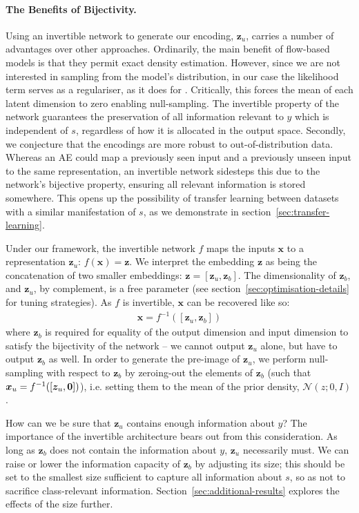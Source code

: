 \paragraph{The Benefits of Bijectivity.}
Using an invertible network to generate our encoding, $\bm{z}_u$, carries a number of advantages over other approaches.
Ordinarily, the main benefit of flow-based models is that they permit exact density estimation. 
However, since we are not interested in sampling from the model's distribution, in our case the likelihood term serves as a regulariser, as it does for  \citet{JacSmeOya18}. 
Critically, this forces the mean of each latent dimension to zero enabling null-sampling. 
The invertible property of the network guarantees the preservation of all information relevant to $y$ which is independent of $s$, regardless of how it is allocated in the output space.
Secondly, we conjecture that the encodings are more robust to out-of-distribution data.
Whereas an \acf{AE} could map a previously seen input and a previously unseen input to the same representation,
an invertible network sidesteps this due to the network's bijective property, ensuring all relevant information is stored somewhere. This opens up the possibility of transfer learning between datasets with a similar manifestation of $s$, as we demonstrate in section~\ref{sec:transfer-learning}.

Under our framework, the invertible network $f$ maps the inputs $\bm{x}$ to a representation $\bm{z}_u$:
$f(\bm{x}) = \bm{z}$.
We interpret the embedding $\bm{z}$ as being the concatenation of two smaller embeddings: $\bm{z} = [\bm{z}_u, \bm{z}_b]$.
The dimensionality of $\bm{z}_b$, and $\bm{z}_u$, by complement, is a free parameter (see section~\ref{sec:optimisation-details} for tuning strategies).
As $f$ is invertible, $\bm{x}$ can be recovered like so:
\begin{align}
  \bm{x} = f^{-1}([\bm{z}_u, \bm{z}_b])
  \label{eq:zreconstruct}
\end{align}
where $\bm{z}_b$ is required for equality of the output dimension and input dimension to satisfy the bijectivity of the network -- we cannot output $\bm{z}_u$ alone, but have to output $\bm{z}_b$ as well. In order to generate the pre-image of $\bm{z}_u$, we perform null-sampling with respect to $\bm{z}_b$ by zeroing-out the elements of $\bm{z}_b$ (such that $\bm{x}_{u} = f^{-1}([\bm{z}_{u}, {\bm{0}}])$), i.e. setting them to the mean of the prior density, $\mathcal{N}(z;0, I)$.

How can we be sure that $\bm{z}_u$ contains enough information about $y$?
The importance of the invertible architecture bears out from this consideration. %
As long as $\bm{z}_b$ does not contain the information about $y$, $\bm{z}_u$ necessarily must.
We can raise or lower the information capacity of $\bm{z}_b$ by adjusting its size;
this should be set to the smallest size sufficient to capture all information about $s$, so as not to sacrifice class-relevant information.
Section~\ref{sec:additional-results} explores the effects of the size further.

